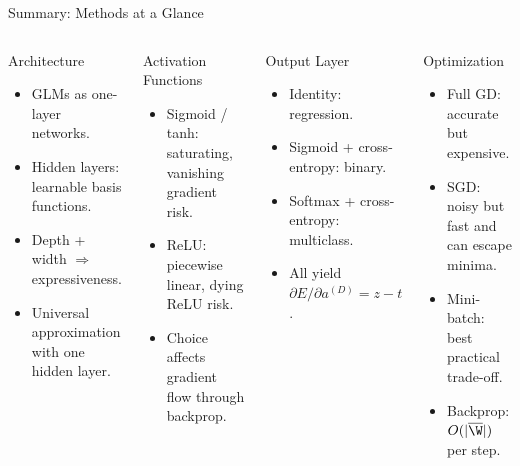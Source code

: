 \begin{frame}{Summary: Methods at a Glance}
  \begin{columns}[t]
      \begin{block}{Architecture}
        \begin{itemize}
          \item GLMs as one-layer networks.
          \item Hidden layers: learnable basis functions.
          \item Depth + width $\Rightarrow$ expressiveness.
          \item Universal approximation with one hidden layer.
        \end{itemize}
      \end{block}
      \vspace{0.4em}
      \begin{block}{Activation Functions}
        \begin{itemize}
          \item Sigmoid / tanh: saturating, vanishing gradient risk.
          \item ReLU: piecewise linear, dying ReLU risk.
          \item Choice affects gradient flow through backprop.
        \end{itemize}
      \end{block}
      \begin{block}{Output Layer}
        \begin{itemize}
          \item Identity: regression.
          \item Sigmoid + cross-entropy: binary.
          \item Softmax + cross-entropy: multiclass.
          \item All yield $\partial E / \partial a^{(D)} = z - t$.
        \end{itemize}
      \end{block}
      \vspace{0.4em}
      \begin{block}{Optimization}
        \begin{itemize}
          \item Full GD: accurate but expensive.
          \item SGD: noisy but fast and can escape minima.
          \item Mini-batch: best practical trade-off.
          \item Backprop: $O(|\overline{\W}|)$ per step.
        \end{itemize}
      \end{block}
  \end{columns}
\end{frame}

%
